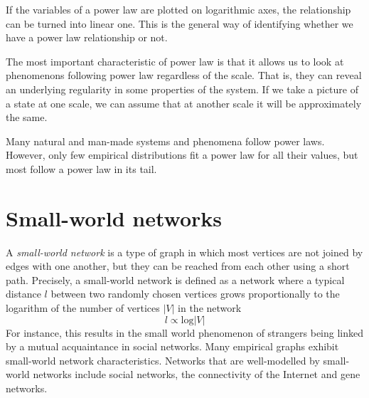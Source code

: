     If the variables of a power law are plotted on logarithmic axes, the relationship can be turned into linear one. This is the general way of identifying whether we have a power law relationship or not.
    
    The most important characteristic of power law is that it allows us to look at phenomenons following power law regardless of the scale. That is, they can reveal an underlying regularity in some properties of the system. If we take a picture of a state at one scale, we can assume that at another scale it will be approximately the same.

    Many natural and man-made systems and phenomena follow power laws. However, only few empirical distributions fit a power law for all their values, but most follow a power law in its tail.
  
  \section{Small-world networks}

    A \emph{small-world network} is a type of graph in which most vertices are not joined by edges with one another, but they can be reached from each other using a short path. Precisely, a small-world network is defined as a network where a typical distance $l$ between two randomly chosen vertices grows proportionally to the logarithm of the number of vertices $|V|$ in the network\cite{WattsStrogatz1998}
    \begin{equation}
    l \propto \mbox{log}|V|
    \end{equation}
    For instance, this results in the small world phenomenon of strangers being linked by a mutual acquaintance in social networks. Many empirical graphs exhibit small-world network characteristics. Networks that are well-modelled by small-world networks include social networks, the connectivity of the Internet and gene networks.

